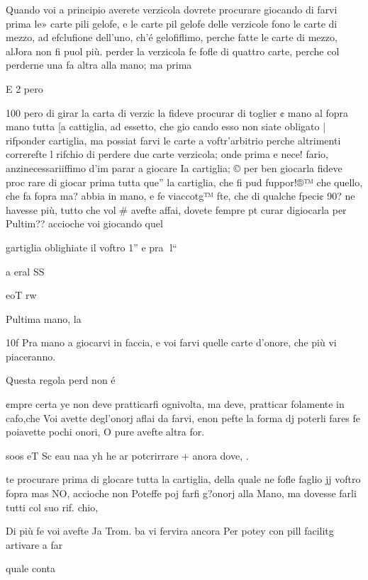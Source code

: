 \documentclass[11pt,a6paper]{article}
\begin{document}
Quando voi a principio averete verzicola dovrete procurare giocando di farvi prima le»
carte pili gelofe, e le carte pil
gelofe delle verzicole fono le
carte di mezzo, ad efclufione
dell’uno, ch’é gelofiflimo, perche fatte le carte di mezzo, alJora non fi puol più. perder la
verzicola fe fofle di quattro carte, perche col perderne una
fa altra alla mano; ma prima

E 2 pero

 

 
 

 

 

 

100
pero di girar la carta di verzic
la fideve procurar di toglier ¢
mano al fopra mano tutta [a
cattiglia, ad essetto, che gio
cando esso non siate obligato |
rifponder cartiglia, ma possiat
farvi le carte a voftr’arbitrio
perche altrimenti correrefte l
rifchio di perdere due carte
verzicola; onde prima e nece!
fario, anzinecessariiffimo d’im
parar a giocare Ia cartiglia; ©
per ben giocarla fideve proc
rare di giocar prima tutta que”
la cartiglia, che fi pud fuppor!®™
che quello, che fa fopra ma?
abbia in mano, e fe viaccotg™
fte, che di qualche fpeci¢ 90?
ne havesse più, tutto che vol #
avefte affai, dovete fempre pt
curar digiocarla per Pultim??
accioche voi giocando quel

gartiglia oblighiate il voftro 1”
e pra
l“

a eral SS

eoT rw

Pultima mano, la

10f
Pra mano a giocarvi in faccia,
e voi farvi quelle carte d’onore,
che più vi piaceranno.

Questa regola perd non é

¢mpre certa ye non deve pratticarfi ognivolta, ma deve,
pratticar folamente in cafo,che
Voi avette degl’onorj aflai da
farvi, enon pefte la forma dj
poterli fares fe poiavette pochi
onori, O pure avefte altra for.

soos eT Sc eau naa yh
he ar potcrirrare + anora dove, .

te procurare prima di glocare
tutta la cartiglia, della quale ne
fofle faglio jj voftro fopra mas
NO, accioche non Poteffe poj
farfi g?onorj alla Mano, ma dovesse farli tutti col suo rif.
chio,

Di più fe voi avefte Ja Trom.
ba vi fervira ancora Per potey
con pill facilitg artivare a far

quale conta
\end{document}
